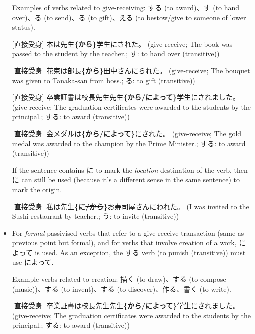 \documentclass[../nihongo-gakushuu-kyouzai.tex]{subfiles}
\begin{document}
\begin{itemize}
    Examples of verbs related to give-receiving: する (to award)、す (to hand over)、る (to send)、る (to gift)、える (to bestow/give to someone of lower status).

    [直接受身] 本は先生\textbf{\{から\}}学生にされた。 (give-receive; The book was passed to the student by the teacher.; す: to hand over (transitive))

    [直接受身] 花束は部長\textbf{\{から\}}田中さんにられた。 (give-receive; The bouquet was given to Tanaka-san from boss.; る: to gift (transitive))

    [直接受身] 卒業証書は校長先生先生\textbf{\{から/によって\}}学生にされました。 (give-receive; The graduation certificates were awarded to the students by the principal.; する: to award (transitive))

    [直接受身] 金メダルは\textbf{\{から/によって\}}にされた。 (give-receive; The gold medal was awarded to the champion by the Prime Minister.; する: to award (transitive))

    If the sentence contains に to mark the \emph{location} destination of the verb, then に can still be used (because it's a different sense in the same sentence) to mark the origin.

    [直接受身] 私は先生\textbf{\{に\st{/から}\}}お寿司屋さんにわれた。 (I was invited to the Sushi restaurant by teacher.; う: to invite (transitive))

    \item For \emph{formal} passivised verbs that refer to a give-receive transaction (same as previous point but formal), and for verbs that involve creation of a work, によって is used. As an exception, the する verb (to punish (transitive)) must use によって.

    Example verbs related to creation: 描く (to draw)、する (to compose (music))、する (to invent)、する (to discover)、作る、書く (to write).

    [直接受身] 卒業証書は校長先生先生\textbf{\{から/によって\}}学生にされました。 (give-receive; The graduation certificates were awarded to the students by the principal.; する: to award (transitive))


\end{itemize}
\end{document}
